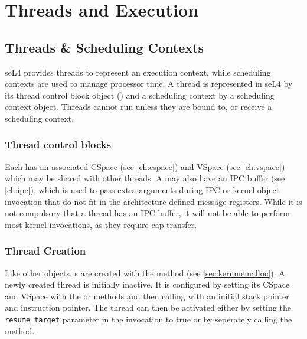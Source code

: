 %
%
%
%

\chapter{\label{ch:threads}Threads and Execution}

\section{Threads \& Scheduling Contexts}
\label{sec:threads}

seL4 provides threads to represent an execution context, while scheduling contexts are used to manage
processor time.
A thread is represented in seL4 by its thread control block
object () and a scheduling context by a scheduling context object.
Threads cannot run unless they are bound to, or receive a scheduling context.

\subsection{Thread control blocks}

Each  has an associated CSpace (see
\autoref{ch:cspace}) and VSpace (see \autoref{ch:vspace}) which
may be shared with other threads. A  may also have an IPC buffer
(see  \autoref{ch:ipc}), which is used to pass extra arguments during IPC
or kernel object invocation that do not fit in the architecture-defined message
registers. While it is not compulsory that a thread has an IPC buffer,
it will not be able to perform most kernel invocations, as they require
cap transfer.


\subsection{Thread Creation}

Like other objects, s are created with the
 method (see
\autoref{sec:kernmemalloc}). A newly created thread is initially inactive. It
is configured by setting its CSpace and VSpace with the
or  methods and then calling
 with an initial stack pointer and instruction
pointer. The thread can then be activated either by setting the
\texttt{resume\_target} parameter in the  invocation to true
or by seperately calling the  method.

